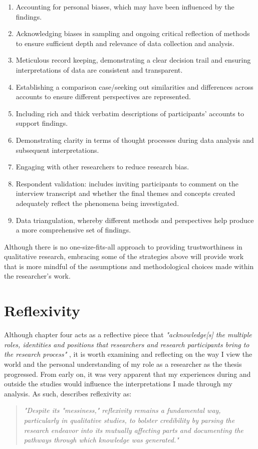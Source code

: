 \begin{enumerate}
    \item Accounting for personal biases, which may have been influenced by the findings.
    \item Acknowledging biases in sampling and ongoing critical reflection of methods to ensure sufficient depth and relevance of data collection and analysis.
    \item Meticulous record keeping, demonstrating a clear decision trail and ensuring interpretations of data are consistent and transparent.
    \item Establishing a comparison case/seeking out similarities and differences across accounts to ensure different perspectives are represented.
    \item Including rich and thick verbatim descriptions of participants’ accounts to support findings.
    \item Demonstrating clarity in terms of thought processes during data analysis and subsequent interpretations.
    \item Engaging with other researchers to reduce research bias.
    \item Respondent validation: includes inviting participants to comment on the interview transcript and whether the final themes and concepts created adequately reflect the phenomena being investigated.
    \item Data triangulation, whereby different methods and perspectives help produce a more comprehensive set of findings.

\end{enumerate}
Although there is no one-size-fits-all approach to providing trustworthiness in qualitative research, embracing some of the strategies above will provide work that is more mindful of the assumptions and methodological choices made within the researcher's work.  


\section{Reflexivity}
\label{Method:Reflectivity}
Although chapter four acts as a reflective piece that \textit{"acknowledge[s] the multiple roles, identities and positions that researchers and research participants bring to the research process"} \citep[pg.395]{milner2007race}, it is worth examining and reflecting on the way I view the world and the personal understanding of my role as a researcher as the thesis progressed. From early on, it was very apparent that my experiences during and outside the studies would influence the interpretations I made through my analysis. As such, \cite{probst2015eye} describes reflexivity as:
\begin{quote}
\textit{"Despite its "messiness," reflexivity remains a fundamental way, particularly in qualitative studies, to bolster credibility by parsing the research endeavor into its mutually affecting parts and documenting the pathways through which knowledge was generated." \citep{probst2015eye}
}\end{quote}

